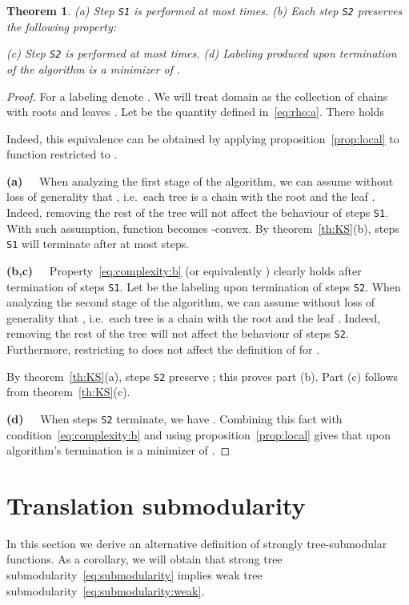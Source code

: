 \documentclass[11pt,onecolumn]{article}
\newtheorem{theorem}{Theorem}
\newcommand{\myparagraph}[1]{{\vspace*{2pt}\noindent\bf{#1}~~}}
\begin{document}
\begin{theorem}
(a) Step {\tt S1} is performed at most  times. (b) Each step {\tt S2} preserves the following
property:

(c) Step {\tt S2} is performed at most  times.
(d) Labeling  produced upon termination of the algorithm is a minimizer of .
\label{th:complexity}
\end{theorem}





\begin{proof}
For a labeling  denote .
We will treat domain  as the collection of chains with roots  and leaves . Let  be the quantity defined in~\eqref{eq:rho:a}. There holds

Indeed, this equivalence can be obtained by applying proposition~\ref{prop:local} to function  restricted to .

\myparagraph{(a)}
When analyzing the first stage of the algorithm, we can assume without loss of generality
that , i.e.\ each tree  is a chain with the root  and
the leaf . 
Indeed, removing the rest of the tree will not affect the behaviour of steps {\tt S1}.
With such assumption, function  becomes -convex. 
By theorem~\ref{th:KS}(b), steps {\tt S1} will terminate after at most  steps.

\myparagraph{(b,c)} Property~\eqref{eq:complexity:b} (or equivalently ) clearly
holds after termination of steps {\tt S1}. Let  be the labeling upon
termination of steps {\tt S2}. 
When analyzing the second stage of the algorithm, we can assume without loss of generality
that , i.e.\ each tree  is a chain with the root  and
the leaf . 
Indeed, removing the rest of the tree will not affect the behaviour of steps {\tt S2}.
Furthermore, restricting  to  does not affect the definition of  for .

By theorem~\ref{th:KS}(a), steps {\tt S2} preserve ; this proves part (b).
Part (c) follows from theorem~\ref{th:KS}(c).

\myparagraph{(d)} When steps {\tt S2} terminate, we have .
Combining this fact with condition~\eqref{eq:complexity:b} and using proposition~\ref{prop:local}
gives that upon algorithm's termination  is a minimizer of .

\end{proof}




\section{Translation submodularity}\label{sec:sw}
In this section we derive an alternative definition of strongly tree-submodular functions.
As a corollary, we will obtain that strong tree submodularity~\eqref{eq:submodularity}
implies weak tree submodularity~\eqref{eq:submodularity:weak}.
\end{document}
